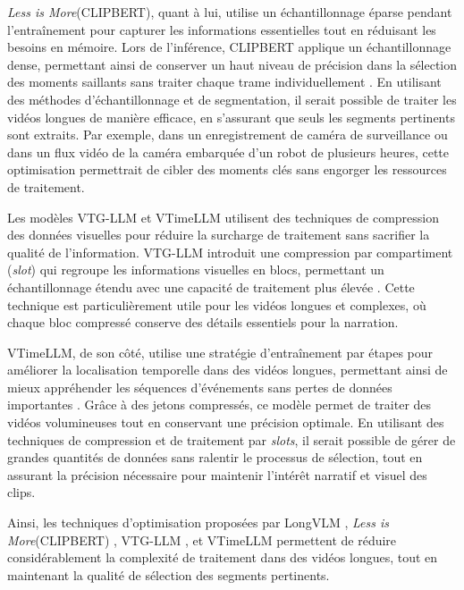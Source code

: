 \textit{Less is More}(CLIPBERT), quant à lui, utilise un échantillonnage éparse pendant l’entraînement pour capturer les informations essentielles tout en réduisant les besoins en mémoire. Lors de l’inférence, CLIPBERT applique un échantillonnage dense, permettant ainsi de conserver un haut niveau de précision dans la sélection des moments saillants sans traiter chaque trame individuellement \cite{lei2021_clipbert}. En utilisant des méthodes d’échantillonnage et de segmentation, il serait possible de traiter les vidéos longues de manière efficace, en s’assurant que seuls les segments pertinents sont extraits. Par exemple, dans un enregistrement de caméra de surveillance ou dans un flux vidéo de la caméra embarquée d’un robot de plusieurs heures, cette optimisation permettrait de cibler des moments clés sans engorger les ressources de traitement.

Les modèles VTG-LLM \cite{guo2024_vtgllm} et VTimeLLM \cite{huang2024_vtimellm} utilisent des techniques de compression des données visuelles pour réduire la surcharge de traitement sans sacrifier la qualité de l’information. VTG-LLM introduit une compression par compartiment  (\textit{slot}) qui regroupe les informations visuelles en blocs, permettant un échantillonnage étendu avec une capacité de traitement plus élevée \cite{guo2024_vtgllm}. Cette technique est particulièrement utile pour les vidéos longues et complexes, où chaque bloc compressé conserve des détails essentiels pour la narration. 

VTimeLLM, de son côté, utilise une stratégie d’entraînement par étapes pour améliorer la localisation temporelle dans des vidéos longues, permettant ainsi de mieux appréhender les séquences d’événements sans pertes de données importantes \cite{huang2024_vtimellm}. Grâce à des jetons compressés, ce modèle permet de traiter des vidéos volumineuses tout en conservant une précision optimale. En utilisant des techniques de compression et de traitement par \textit{slots}, il serait possible de gérer de grandes quantités de données sans ralentir le processus de sélection, tout en assurant la précision nécessaire pour maintenir l’intérêt narratif et visuel des clips.

Ainsi, les techniques d’optimisation proposées par LongVLM \cite{weng2024}, \textit{Less is More}(CLIPBERT) \cite{lei2021_clipbert}, VTG-LLM \cite{guo2024_vtgllm}, et VTimeLLM \cite{huang2024_vtimellm} permettent de réduire considérablement la complexité de traitement dans des vidéos longues, tout en maintenant la qualité de sélection des segments pertinents.

